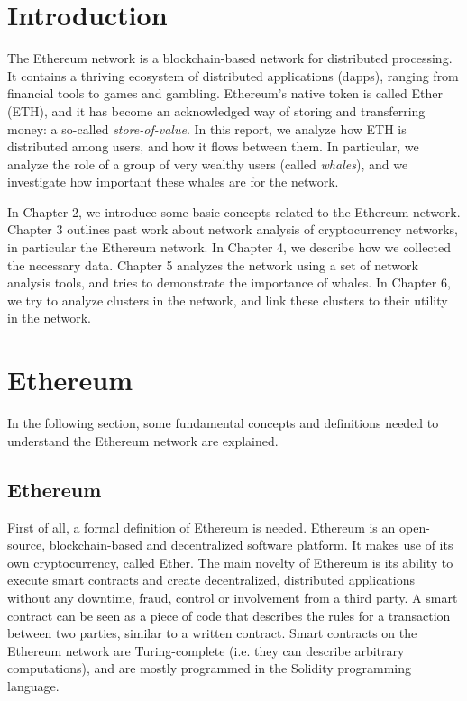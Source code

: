 \documentclass[10pt,a4paper]{article}
\begin{document}
\begin{multicols}{2}

\section{Introduction}
The Ethereum network is a blockchain-based network for distributed processing. It contains a thriving ecosystem of distributed applications (dapps), ranging from financial tools to games and gambling. Ethereum's native token is called Ether (ETH), and it has become an acknowledged way of storing and transferring money: a so-called \textit{store-of-value}. In this report, we analyze how ETH is distributed among users, and how it flows between them. In particular, we analyze the role of a group of very wealthy users (called \textit{whales}), and we investigate how important these whales are for the network.

In Chapter 2, we introduce some basic concepts related to the Ethereum network. Chapter 3 outlines past work about network analysis of cryptocurrency networks, in particular the Ethereum network. In Chapter 4, we describe how we collected the necessary data. Chapter 5 analyzes the network using a set of network analysis tools, and tries to demonstrate the importance of whales. In Chapter 6, we try to analyze clusters in the network, and link these clusters to their utility in the network. 

\section{Ethereum}

In the following section, some fundamental concepts and definitions needed to understand the Ethereum network are explained.

\subsection{Ethereum}
First of all, a formal definition of Ethereum is needed. Ethereum is an open-source, blockchain-based and decentralized software platform. It makes use of its own cryptocurrency, called Ether. The main novelty of Ethereum is its ability to execute smart contracts and create decentralized, distributed applications without any downtime, fraud, control or involvement from a third party. A smart contract can be seen as a piece of code that describes the rules for a transaction between two parties, similar to a written contract. Smart contracts on the Ethereum network are Turing-complete (i.e. they can describe arbitrary computations), and are mostly programmed in the Solidity programming language. 

\end{multicols}
\end{document}
